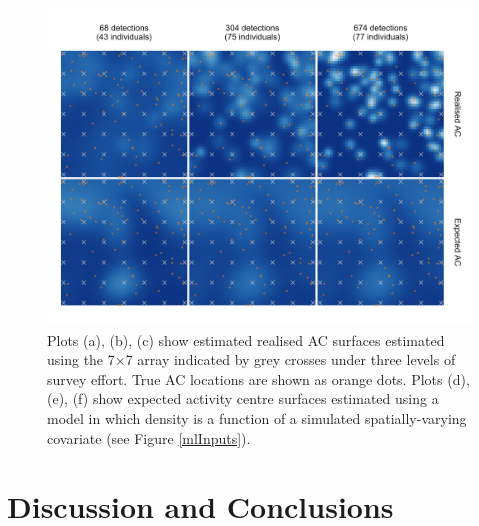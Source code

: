 \documentclass[useAMS,usenatbib,referee]{biom}
\begin{document}
\begin{figure}[htbp]
\centering
\includegraphics[width=1\textwidth]{mona_7x7.png}
\caption{Plots (a), (b), (c) show estimated realised AC surfaces estimated using the 7$\times$7 array indicated by grey crosses under three levels of survey effort. True AC locations are shown as orange dots. Plots (d), (e), (f) show expected activity centre surfaces estimated using a model in which density is a function of a simulated spatially-varying covariate (see Figure \ref{mlInputs}).}
\label{mona7x7}
\end{figure}

\section{Discussion and Conclusions} \label{discussion}
 
\end{document}

